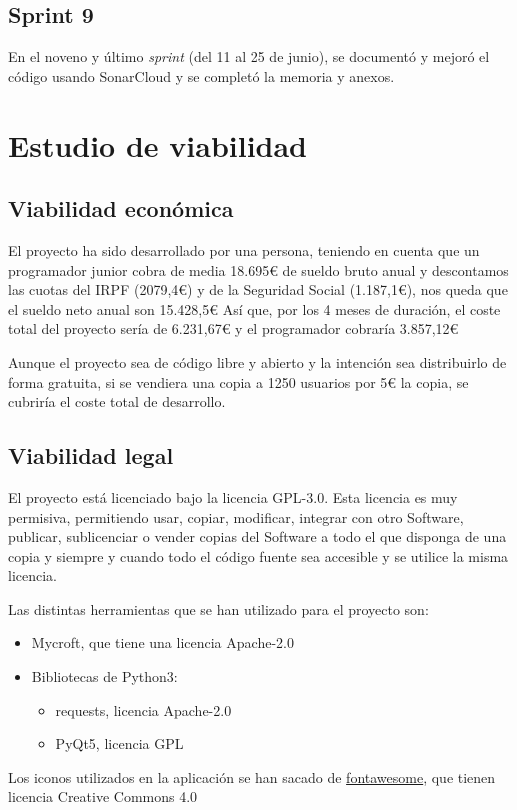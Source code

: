 \subsection{Sprint 9}

En el noveno y último \textit{sprint} (del 11 al 25 de junio), se documentó y mejoró el código usando SonarCloud y se completó la memoria y anexos.

\section{Estudio de viabilidad}

\subsection{Viabilidad económica}

El proyecto ha sido desarrollado por una persona, teniendo en cuenta que un programador junior cobra de media 18.695€\cite{SalariosParaEmpleos} de sueldo bruto anual y descontamos las cuotas del IRPF (2079,4€) y de la Seguridad Social (1.187,1€), nos queda que el sueldo neto anual son 15.428,5€
Así que, por los 4 meses de duración, el coste total del proyecto sería de 6.231,67€ y el programador cobraría 3.857,12€

Aunque el proyecto sea de código libre y abierto y la intención sea distribuirlo de forma gratuita, si se vendiera una copia a 1250 usuarios por 5€ la copia, se cubriría el coste total de desarrollo.

\subsection{Viabilidad legal}

El proyecto está licenciado bajo la licencia GPL-3.0. Esta licencia es muy permisiva, permitiendo usar, copiar, modificar, integrar con otro Software, publicar, sublicenciar o vender copias del Software a todo el que disponga de una copia y siempre y cuando todo el código fuente sea accesible y se utilice la misma licencia.

Las distintas herramientas que se han utilizado para el proyecto son:
\begin{itemize}
	\item Mycroft, que tiene una licencia Apache-2.0\cite{penrodHavingRightLicense2017}
	\item Bibliotecas de Python3:
	\begin{itemize}
		\item requests\cite{RequestsSoftware2020}, licencia Apache-2.0
		\item PyQt5\cite{RiverbankComputingLicense}, licencia GPL
	\end{itemize}
\end{itemize}

Los iconos utilizados en la aplicación se han sacado de \href{https://fontawesome.com/icons?d=gallery}{fontawesome}, que tienen licencia Creative Commons 4.0\cite{FontAwesome}